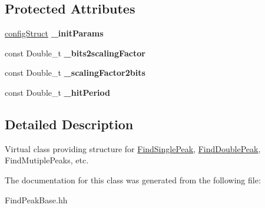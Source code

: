 \subsection*{Protected Attributes}
\begin{DoxyCompactItemize}
\item 
\hypertarget{class_find_peak_base_af020ca3bc5ab34bde76382150e06c558}{}\hyperlink{structconfig_struct}{config\+Struct} {\bfseries \+\_\+init\+Params}\label{class_find_peak_base_af020ca3bc5ab34bde76382150e06c558}

\item 
\hypertarget{class_find_peak_base_a1dd81b2aed6ceff885cd371dbe23b9cb}{}const Double\+\_\+t {\bfseries \+\_\+bits2scaling\+Factor}\label{class_find_peak_base_a1dd81b2aed6ceff885cd371dbe23b9cb}

\item 
\hypertarget{class_find_peak_base_aeacee514c100fe4def492565ab20ef5d}{}const Double\+\_\+t {\bfseries \+\_\+scaling\+Factor2bits}\label{class_find_peak_base_aeacee514c100fe4def492565ab20ef5d}

\item 
\hypertarget{class_find_peak_base_a23da473fdf06ed61af98530dd6a9e231}{}const Double\+\_\+t {\bfseries \+\_\+hit\+Period}\label{class_find_peak_base_a23da473fdf06ed61af98530dd6a9e231}

\end{DoxyCompactItemize}


\subsection{Detailed Description}
Virtual class providing structure for \hyperlink{class_find_single_peak}{Find\+Single\+Peak}, \hyperlink{class_find_double_peak}{Find\+Double\+Peak}, Find\+Mutiple\+Peaks, etc. 

The documentation for this class was generated from the following file\+:\begin{DoxyCompactItemize}
\item 
Find\+Peak\+Base.\+hh\end{DoxyCompactItemize}

